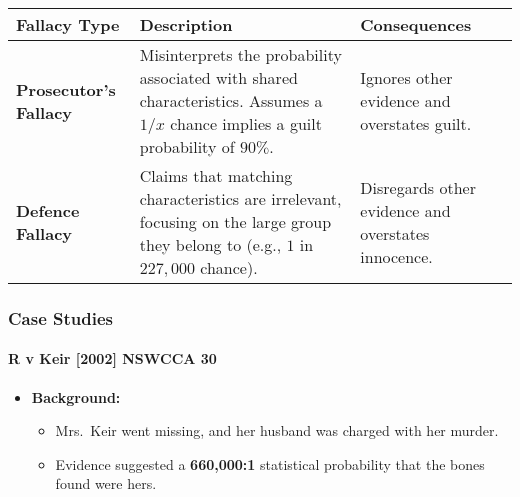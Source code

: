 \begin{longtable}[]{@{}
  >{\raggedright\arraybackslash}p{}
  >{\raggedright\arraybackslash}p{}
  >{\raggedright\arraybackslash}p{}@{}}
\toprule\noalign{}
\begin{minipage}[b]{\linewidth}\raggedright
Fallacy Type
\end{minipage} & \begin{minipage}[b]{\linewidth}\raggedright
Description
\end{minipage} & \begin{minipage}[b]{\linewidth}\raggedright
Consequences
\end{minipage} \\
\midrule\noalign{}
\endhead
\bottomrule\noalign{}
\endlastfoot
\textbf{Prosecutor's Fallacy} & Misinterprets the probability associated
with shared characteristics. Assumes a \(1/x\) chance implies a guilt
probability of \(90\%\). & Ignores other evidence and overstates
guilt. \\
\textbf{Defence Fallacy} & Claims that matching characteristics are
irrelevant, focusing on the large group they belong to (e.g., \(1\) in
\(227,000\) chance). & Disregards other evidence and overstates
innocence. \\
\end{longtable}

\subsubsection{Case Studies}\label{case-studies}

\paragraph{R v Keir {[}2002{]} NSWCCA 30}\label{r-v-keir-2002-nswcca-30}

\begin{itemize}
\tightlist
\item
  \textbf{Background:}

  \begin{itemize}
  \tightlist
  \item
    Mrs.~Keir went missing, and her husband was charged with her murder.
  \item
    Evidence suggested a \textbf{660,000:1} statistical probability that
    the bones found were hers.
  \end{itemize}
\end{itemize}

